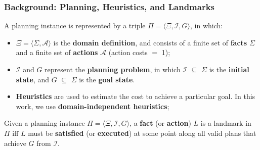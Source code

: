 \documentclass{beamer}
\begin{document}
\begin{frame}[c]\frametitle{Background: Planning, Heuristics, and Landmarks}
	\vspace{-2mm}
	\begin{definition}[Planning]
		A planning instance is represented by a triple $\Pi = \langle \Xi, \mathcal{I}, G\rangle$, in which:
		\begin{itemize}
			\item $\Xi= \langle \Sigma, \mathcal{A}\rangle$ is the \textbf{domain definition}, and consists of a finite set of \textbf{facts} $\Sigma$ and a finite set of \textbf{actions} $\mathcal{A}$ (action costs $=$ 1);
			\item $\mathcal{I}$ and $G$ represent the \textbf{planning problem}, in which $\mathcal{I}$ $\subseteq$ $\Sigma$ is the \textbf{initial state}, and $G$ $\subseteq$ $\Sigma$ is the \textbf{goal state}.
		\end{itemize}
	\end{definition}
	\vspace{-3mm}
	\begin{itemize}
		\item \textbf{Heuristics} are used to estimate the cost to achieve a particular goal. In this work, we use \textbf{domain-independent heuristics};
	\end{itemize}
	\vspace{-3mm}
	\begin{definition}[Landmarks]
		Given a planning instance $\Pi = \langle \Xi, \mathcal{I}, G\rangle$, a \textbf{fact} (or \textbf{action}) $L$ is a landmark in $\Pi$ iff $L$ 	must be \textbf{satisfied} (or \textbf{executed}) at some point along all valid plans that achieve $G$ from $\mathcal{I}$.
	\end{definition}
\end{frame}

\end{document}
